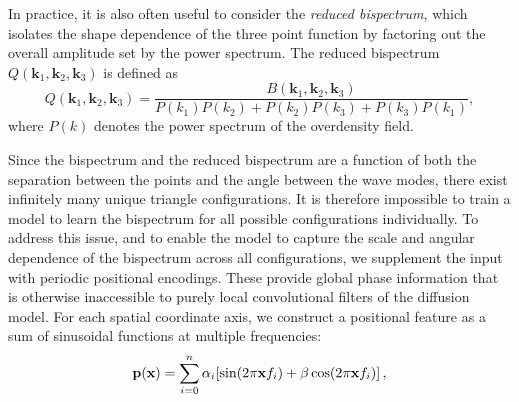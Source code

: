 In practice, it is also often useful to consider the \emph{reduced bispectrum}, which isolates the shape dependence of the three point function by factoring
out the overall amplitude set by the power spectrum.
The reduced bispectrum $Q(\mathbf{k}_1,\mathbf{k}_2,\mathbf{k}_3)$ is defined as
\begin{equation}
Q(\mathbf{k}_1,\mathbf{k}_2,\mathbf{k}_3)
=
\frac{
B(\mathbf{k}_1,\mathbf{k}_2,\mathbf{k}_3)
}{
P(k_1)P(k_2)
+
P(k_2)P(k_3)
+
P(k_3)P(k_1)
},
\end{equation}
where $P(k)$ denotes the power spectrum of the overdensity field.


\vspace{\baselineskip}

Since the bispectrum and the reduced bispectrum are a function of both the separation between the points and the angle between the wave modes, there exist infinitely many unique triangle configurations. It is therefore impossible to train a model to learn the bispectrum for all possible configurations individually.
To address this issue, and to enable the model to capture the scale and angular dependence of the bispectrum across all configurations, we supplement the \FOLD input with periodic positional encodings. These provide global phase information that is otherwise inaccessible to purely local convolutional filters of the diffusion model. For each spatial coordinate axis, we construct a positional feature as a sum of sinusoidal functions at multiple frequencies:
\begin{equation} \label{eq:pos_embedding}
   \textbf{p}(\textbf{x})=\displaystyle\sum_{i=0}^n  \alpha_i[\sin(2\pi\textbf{x}f_i) + \beta\cos(2\pi\textbf{x}f_i)] \,,
\end{equation}
